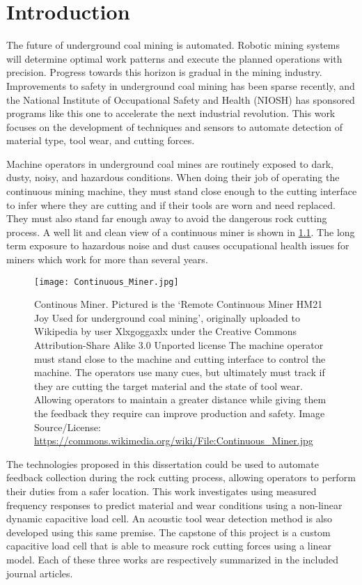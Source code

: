 \chapter{Introduction}\label{chap:1}

The future of underground coal mining is automated. 
Robotic mining systems will determine optimal work patterns and execute
the planned operations with precision.
Progress towards this horizon is gradual in the mining industry.
Improvements to safety in underground coal mining has been sparse recently,
and the National Institute of Occupational Safety and Health (NIOSH) has sponsored
programs like this one to accelerate the next industrial revolution.
This work focuses on the development of techniques and sensors to automate detection
of material type, tool wear, and cutting forces.

Machine operators in underground coal mines are routinely exposed to dark, dusty, noisy, and
hazardous conditions. When doing their job of operating the continuous mining machine,
they must stand close enough to the cutting interface to infer where they are cutting and 
if their tools are worn and need replaced. They must also stand far enough away to avoid
the dangerous rock cutting process. 
A well lit and clean view of a continuous miner is shown in \ref{fig:conminer}.
 The long term exposure to hazardous noise and dust causes 
occupational health issues for miners which work for more than several years.

\begin{figure}[ht]
\centering
\texttt{[image: Continuous\_Miner.jpg]}
\caption{Continous Miner. Pictured is the `Remote Continuous Miner HM21 Joy Used for underground coal mining',
 originally uploaded to Wikipedia by user Xlxgoggaxlx 
 under the Creative Commons Attribution-Share Alike 3.0 Unported license
 The machine operator must stand close to the machine and cutting interface to control the machine.
The operators use many cues, but ultimately must track if they are cutting the target material and 
the state of tool wear. Allowing operators to maintain a greater distance while giving them
the feedback they require can improve production and safety.
Image Source/License: \url{https://commons.wikimedia.org/wiki/File:Continuous_Miner.jpg}
}
\label{fig:conminer}
\end{figure}

The technologies proposed in this dissertation could be used to automate feedback collection
during the rock cutting process, allowing operators to perform their duties from a safer location.
This work investigates using measured frequency responses to predict material and wear conditions
using a non-linear dynamic capacitive load cell. 
An acoustic tool wear detection method is also developed using this same premise.
The capstone of this project is a custom capacitive load cell that is able to measure 
rock cutting forces using a linear model. 
Each of these three works are respectively summarized in the included journal articles.

